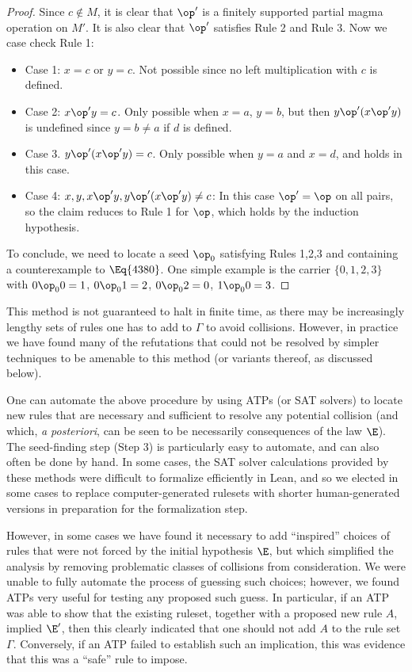 \begin{proof}
Since $c \not \in M$, it is clear that $\op'$ is a finitely supported partial magma operation on $M'$.  It is also clear that $\op'$ satisfies Rule 2 and Rule 3.   Now we case check Rule 1:
\begin{itemize}
\item Case 1: $x=c$ or $y=c$.  Not possible since no left multiplication with $c$ is defined.
\item Case 2: $x \op' y = c$.  Only possible when $x = a$, $y = b$, but then $y \op' (x \op' y)$ is undefined since $y = b \neq a$ if $d$ is defined.
\item Case 3. $y \op' (x \op' y) = c$.  Only possible when $y=a$ and $x=d$, and holds in this case.
\item Case 4: $x, y, x \op' y, y \op' (x \op' y) \neq c$: In this case $\op'=\op$ on all pairs, so the claim reduces to Rule 1 for $\op$, which holds by the induction hypothesis.
\end{itemize}
To conclude, we need to locate a seed $\op_0$ satisfying Rules 1,2,3 and containing a counterexample to $\Eq{4380}$.  One simple example is the carrier $\{0,1,2,3\}$ with $0 \op_0 0 = 1$, $0 \op_0 1 = 2$, $0 \op_0 2 = 0$, $1 \op_0 0 = 3$.
\end{proof}

This method is not guaranteed to halt in finite time, as there may be increasingly lengthy sets of rules one has to add to $\Gamma$ to avoid collisions.  However, in practice we have found many of the refutations that could not be resolved by simpler techniques to be amenable to this method (or variants thereof, as discussed below).

One can automate the above procedure by using ATPs (or SAT solvers) to locate new rules that are necessary and sufficient to resolve any potential collision (and which, \emph{a posteriori}, can be seen to be necessarily consequences of the law $\E$).  The seed-finding step (Step 3) is particularly easy to automate, and can also often be done by hand.  In some cases, the SAT solver calculations provided by these methods were difficult to formalize efficiently in Lean, and so we elected in some cases to replace computer-generated rulesets with shorter human-generated versions in preparation for the formalization step.

However, in some cases we have found it necessary to add ``inspired'' choices of rules that were not forced by the initial hypothesis $\E$, but which simplified the analysis by removing problematic classes of collisions from consideration.  We were unable to fully automate the process of guessing such choices; however, we found ATPs very useful for testing any proposed such guess.  In particular, if an ATP was able to show that the existing ruleset, together with a proposed new rule $A$, implied ${\E'}$, then this clearly indicated that one should not add $A$ to the rule set $\Gamma$.  Conversely, if an ATP failed to establish such an implication, this was evidence that this was a ``safe'' rule to impose.

